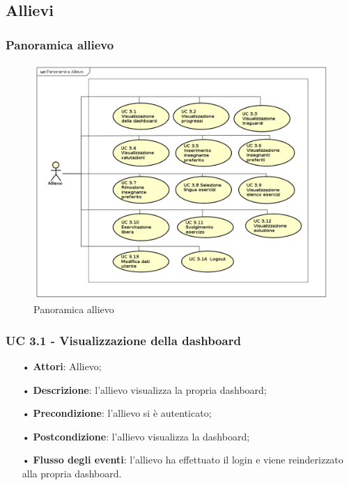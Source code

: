 \subsection{Allievi}
\subsubsection{Panoramica allievo}

\begin{figure}[H]
\centering
\includegraphics[width=17cm]{img/PanoramicaAllievi.png} 
\caption{Panoramica allievo}\label{fig:31}
\end{figure}


\subsubsection{UC 3.1 - Visualizzazione della dashboard}
\begin{itemize}
\item[•]\textbf{Attori}: Allievo;
\item[•]\textbf{Descrizione}: l'allievo visualizza la propria dashboard;
\item[•]\textbf{Precondizione}: l'allievo si è autenticato;
\item[•]\textbf{Postcondizione}: l'allievo visualizza la dashboard;
\item[•]\textbf{Flusso degli eventi}: l'allievo ha effettuato il login e viene reinderizzato alla propria dashboard.
\end{itemize}

